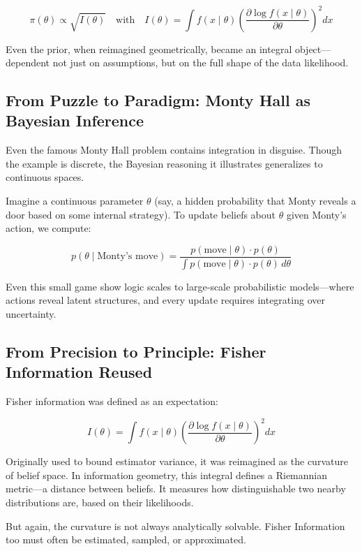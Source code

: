\[
\pi(\theta) \propto \sqrt{I(\theta)} \quad \text{with} \quad I(\theta) = \int f(x \mid \theta) \left( \frac{\partial \log f(x \mid \theta)}{\partial \theta} \right)^2 dx
\]

Even the prior, when reimagined geometrically, became an integral object—dependent not just on assumptions, but on the full shape of the data likelihood.





\subsection{From Puzzle to Paradigm: Monty Hall as Bayesian Inference}

Even the famous Monty Hall problem contains integration in disguise. Though the example is discrete, the Bayesian reasoning it illustrates generalizes to continuous spaces.

Imagine a continuous parameter \( \theta \) (say, a hidden probability that Monty reveals a door based on some internal strategy). To update beliefs about \( \theta \) given Monty's action, we compute:

\[
p(\theta \mid \text{Monty's move}) = \frac{p(\text{move} \mid \theta) \cdot p(\theta)}{\int p(\text{move} \mid \theta) \cdot p(\theta) \, d\theta}
\]

Even this small game show logic scales to large-scale probabilistic models—where actions reveal latent structures, and every update requires integrating over uncertainty.


\subsection{From Precision to Principle: Fisher Information Reused}


Fisher information was defined as an expectation:

\[
I(\theta) = \int f(x \mid \theta) \left( \frac{\partial \log f(x \mid \theta)}{\partial \theta} \right)^2 dx
\]

Originally used to bound estimator variance, it was reimagined as the curvature of belief space. In information geometry, this integral defines a Riemannian metric—a distance between beliefs. It measures how distinguishable two nearby distributions are, based on their likelihoods.

But again, the curvature is not always analytically solvable. Fisher Information too must often be estimated, sampled, or approximated.

